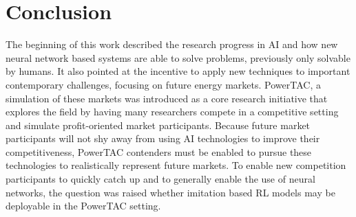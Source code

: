 %
%
%
%
%
%
%
%

\section{Conclusion}%
\label{sec:conclusion}

The beginning of this work described the research progress in \ac{AI} and how new neural network based
systems are able to solve problems, previously only solvable by humans. It also pointed at the incentive to
apply new techniques to important contemporary challenges, focusing on future energy markets.
\ac{PowerTAC}, a simulation of these markets was introduced as a core research initiative that explores the field by
having many researchers compete in a competitive setting and simulate profit-oriented market participants. Because
future market participants will not shy away from using \ac{AI} technologies to improve their competitiveness,
\ac{PowerTAC} contenders must be enabled to pursue these technologies to realistically represent future markets. To
enable new competition participants to quickly catch up and to generally enable the use of neural networks, the question
was raised whether imitation based \ac{RL} models may be deployable in the \ac{PowerTAC} setting.

